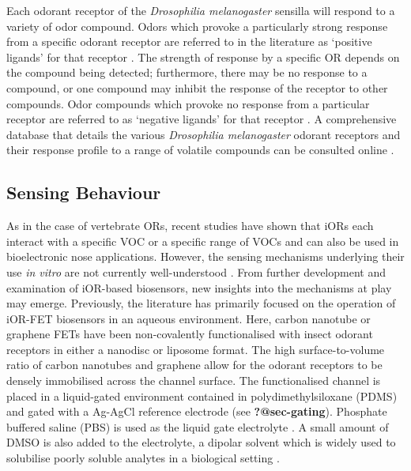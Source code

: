\documentclass[
  a4paper,
]{scrbook}
\begin{document}
Each odorant receptor of the \emph{Drosophilia melanogaster} sensilla
will respond to a variety of odor compound. Odors which provoke a
particularly strong response from a specific odorant receptor are
referred to in the literature as `positive ligands' for that receptor
\autocite{Murugathas2019a,Murugathas2020}. The strength of response by a
specific OR depends on the compound being detected; furthermore, there
may be no response to a compound, or one compound may inhibit the
response of the receptor to other compounds. Odor compounds which
provoke no response from a particular receptor are referred to as
`negative ligands' for that receptor
\autocite{Murugathas2019a,Murugathas2020}. A comprehensive database that
details the various \emph{Drosophilia melanogaster} odorant receptors
and their response profile to a range of volatile compounds can be
consulted online \autocite{Munch2016}.

\hypertarget{sensing-behaviour}{%
\subsection{Sensing Behaviour}\label{sensing-behaviour}}

As in the case of vertebrate ORs, recent studies have shown that iORs
each interact with a specific VOC or a specific range of VOCs and can
also be used in bioelectronic nose applications. However, the sensing
mechanisms underlying their use \emph{in vitro} are not currently
well-understood \autocite{Murugathas2019a,Murugathas2020,Khadka2019}.
From further development and examination of iOR-based biosensors, new
insights into the mechanisms at play may emerge. Previously, the
literature has primarily focused on the operation of iOR-FET biosensors
in an aqueous environment. Here, carbon nanotube or graphene FETs have
been non-covalently functionalised with insect odorant receptors in
either a nanodisc or liposome format. The high surface-to-volume ratio
of carbon nanotubes and graphene allow for the odorant receptors to be
densely immobilised across the channel surface. The functionalised
channel is placed in a liquid-gated environment contained in
polydimethylsiloxane (PDMS) and gated with a Ag-AgCl reference electrode
(see \textbf{?@sec-gating}). Phosphate buffered saline (PBS) is used as
the liquid gate electrolyte \autocite{Murugathas2019a,Murugathas2020}. A
small amount of DMSO is also added to the electrolyte, a dipolar solvent
which is widely used to solubilise poorly soluble analytes in a
biological setting \autocite{Galvao2014}.
\end{document}
